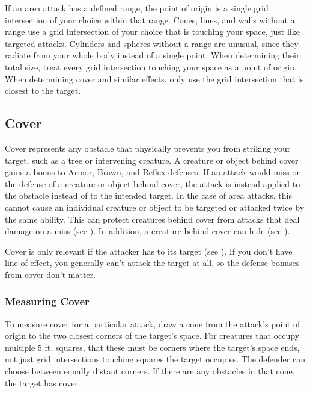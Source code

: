     If an area attack has a defined range, the point of origin is a single grid intersection of your choice within that range.
    Cones, lines, and walls without a range use a grid intersection of your choice that is touching your space, just like targeted attacks.
    Cylinders and spheres without a range are unusual, since they radiate from your whole body instead of a single point.
    When determining their total size, treat every grid intersection touching your space as a point of origin.
    When determining cover and similar effects, only use the grid intersection that is closest to the target.

  \subsection{Cover}\label{Cover}

    Cover represents any obstacle that physically prevents you from striking your target, such as a tree or intervening creature.
    A creature or object behind cover gains a  bonus to Armor, Brawn, and Reflex defenses.
    If an attack would miss or  the defense of a creature or object behind cover,
    the attack is instead applied to the obstacle instead of to the intended target.
    In the case of area attacks, this cannot cause an individual creature or object to be targeted or attacked twice by the same ability.
    This can protect creatures behind cover from attacks that deal damage on a miss (see ).
    In addition, a creature behind cover can hide (see ).

    Cover is only relevant if the attacker has  to its target (see ).
    If you don't have line of effect, you generally can't attack the target at all, so the defense bonuses from cover don't matter.

    \subsubsection{Measuring Cover}
      To measure cover for a particular attack, draw a cone from the attack's point of origin to the two closest corners of the target's space.
      For creatures that occupy multiple 5 ft. squares, that these must be corners where the target's space ends, not just grid intersections touching squares the target occupies.
      The defender can choose between equally distant corners.
      If there are any obstacles in that cone, the target has cover.

